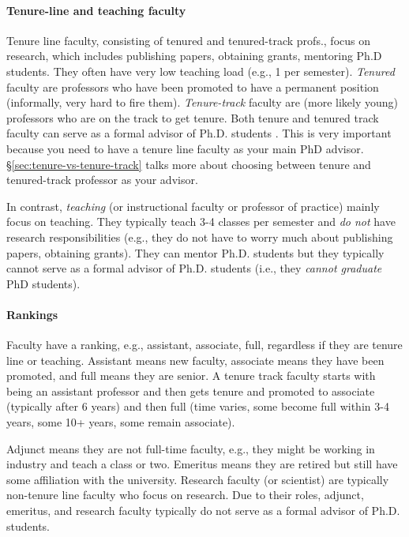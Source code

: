 \documentclass[11pt]{article}
\begin{document}
\paragraph{Tenure-line and teaching faculty} Tenure line faculty, consisting of tenured and tenured-track profs., focus on research, which includes publishing papers, obtaining grants, mentoring Ph.D students.  They often have very low teaching load (e.g., 1 per semester). \emph{Tenured} faculty are professors who have been promoted to have a permanent position (informally, very hard to fire them).   \emph{Tenure-track} faculty are (more likely young) professors who are on the track to get tenure.  Both tenure and tenured track faculty can serve as a formal advisor of Ph.D. students . This is very important because you need to have a tenure line faculty as your main PhD advisor. \S\ref{sec:tenure-vs-tenure-track} talks more about choosing between tenure and tenured-track professor as your advisor.

In contrast, \emph{teaching} (or instructional faculty or professor of practice) mainly focus on teaching. They typically teach 3-4 classes per semester and \emph{do not} have research responsibilities (e.g., they do not have to worry much about publishing papers, obtaining grants).  They can mentor Ph.D. students but they typically cannot serve as a formal advisor of Ph.D. students (i.e., they \emph{cannot graduate} PhD students).

\paragraph{Rankings} Faculty have a ranking, e.g., assistant, associate, full, regardless if they are tenure line or teaching.  Assistant means new faculty, associate means they have been promoted, and full means they are senior. A tenure track faculty starts with being an assistant professor and then gets tenure and promoted to associate (typically after 6 years) and then full (time varies, some become full within 3-4 years, some 10+ years, some remain associate). 

Adjunct means they are not full-time faculty, e.g., they might be working in industry and teach a class or two.  Emeritus means they are retired but still have some affiliation with the university.  Research faculty (or scientist) are typically non-tenure line faculty who focus on research.  Due to their roles, adjunct, emeritus, and research faculty typically do not serve as a formal advisor of Ph.D. students.
\end{document}
